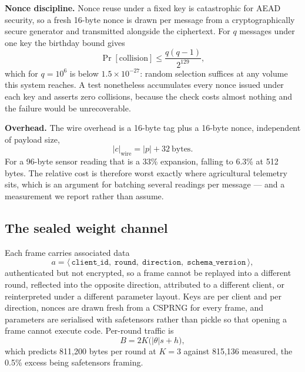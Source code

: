 \documentclass[conference]{IEEEtran}
\begin{document}
\textbf{Nonce discipline.} Nonce reuse under a fixed key is catastrophic for AEAD security, so a
fresh 16-byte nonce is drawn per message from a cryptographically secure generator and
transmitted alongside the ciphertext. For $q$ messages under one key the birthday bound gives
\begin{equation}
\Pr[\text{collision}] \le \frac{q(q-1)}{2^{129}},
\label{eq:nonce}
\end{equation}
which for $q = 10^{6}$ is below $1.5 \times 10^{-27}$: random selection suffices at any volume
this system reaches. A test nonetheless accumulates every nonce issued under each key and asserts
zero collisions, because the check costs almost nothing and the failure would be unrecoverable.

\textbf{Overhead.} The wire overhead is a 16-byte tag plus a 16-byte nonce, independent of
payload size,
\begin{equation}
|c|_{\text{wire}} = |p| + 32 \ \text{bytes}.
\label{eq:overhead}
\end{equation}
For a 96-byte sensor reading that is a 33\% expansion, falling to 6.3\% at 512 bytes. The relative
cost is therefore worst exactly where agricultural telemetry sits, which is an argument for
batching several readings per message --- and a measurement we report rather than assume.

\subsection{The sealed weight channel}\label{sec:channel}
Each frame carries associated data
\begin{equation}
a = \langle\, \texttt{client\_id},\; \texttt{round},\;
\texttt{direction},\; \texttt{schema\_version} \,\rangle,
\label{eq:weightad}
\end{equation}
authenticated but not encrypted, so a frame cannot be replayed into a different round, reflected
into the opposite direction, attributed to a different client, or reinterpreted under a different
parameter layout. Keys are per client and per direction, nonces are drawn fresh from a CSPRNG for
every frame, and parameters are serialised with safetensors rather than pickle so that opening a
frame cannot execute code. Per-round traffic is
\begin{equation}
B = 2K\big(|\theta| s + h\big),
\label{eq:bytes}
\end{equation}
which predicts 811{,}200 bytes per round at $K=3$ against 815{,}136 measured, the
0.5\% excess being safetensors framing.
\end{document}
